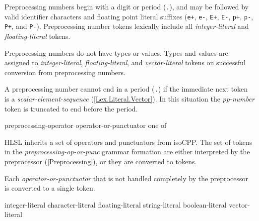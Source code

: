 \p Preprocessing numbers begin with a digit or period (\texttt{.}), and may be
followed by valid identifier characters and floating point literal suffixes
(\texttt{e+}, \texttt{e-}, \texttt{E+}, \texttt{E-}, \texttt{p+}, \texttt{p-},
\texttt{P+}, and \texttt{P-}). Preprocessing number tokens lexically include all
\textit{integer-literal} and \textit{floating-literal} tokens.

\p Preprocessing numbers do not have types or values. Types and values are
assigned to \textit{integer-literal}, \textit{floating-literal}, and
\textit{vector-literal} tokens on successful conversion from preprocessing
numbers.

\p A preprocessing number cannot end in a period (\texttt{.}) if the immediate
next token is a \textit{scalar-element-sequence} (\ref{Lex.Literal.Vector}). In
this situation the \textit{pp-number} token is truncated to end before the
period.




\begin{grammar}
  \br
    preprocessing-operator\br
    operator-or-punctuator
  \br
    \terminal{#}\br
    \terminal{##}
  \textnormal{one of}\br
    \br
    \br
    \terminal{! + - * / \% ^ & |}\br
    \terminal{= += -= *= /= \%= ^= &= |=}\br
    \terminal{== += < > <= >= && ||}\br
    \terminal{<< >> <<= >>= ++ -- ,}
\end{grammar}

\p HLSL inherits a set of operators and punctuators from \gls{isoCPP}. The set
of tokens in the \textit{preprocessing-op-or-punc} grammar formation are either
interpreted by the preprocessor (\ref{Preprocessing}), or they are converted to
tokens.

\p Each \textit{operator-or-punctuator} that is not handled completely by the
preprocessor is converted to a single token.


\begin{grammar}
  \br
  integer-literal\br
  character-literal\br
  floating-literal\br
  string-literal\br
  boolean-literal\br
  vector-literal
\end{grammar}

